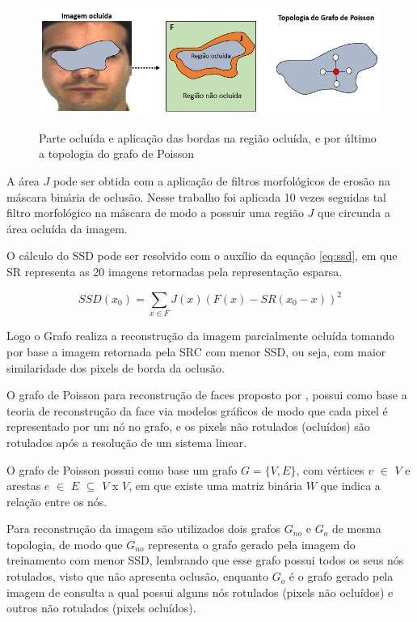 \begin{figure}[H]
\centering
\caption{Parte ocluída e  aplicação das bordas na região ocluída, e por último a topologia do grafo de Poisson}
\includegraphics[scale = 0.8]{imgs/ssd}
\label{fig:ssd}
\end{figure}

A área $J$ pode ser obtida com a aplicação de filtros morfológicos de erosão na máscara binária de oclusão. Nesse trabalho foi aplicada 10 vezes seguidas tal filtro morfológico na máscara de modo a possuir uma região $J$ que circunda a área ocluída da imagem.  
 
O cálculo do SSD pode ser resolvido com o auxílio da equação \ref{eq:ssd}, em que SR representa as 20 imagens retornadas pela representação esparsa. 

\begin{equation}
SSD(x_0) = \sum_{x\in F }J(x)(F(x) - SR(x_0 - x))^2 
\label{eq:ssd}
\end{equation}

Logo o Grafo realiza a reconstrução da imagem parcialmente ocluída tomando por base a imagem retornada pela SRC com menor SSD, ou seja, com maior similaridade dos pixels de borda da oclusão.

O grafo de Poisson para reconstrução de faces proposto por ,  possui como base a teoria de reconstrução da face via modelos gráficos de modo que cada pixel é representado por um nó no grafo, e os pixels não rotulados (ocluídos) são rotulados após a resolução de um sistema linear.

O grafo de Poisson possui como base um grafo $G = \{V,E\}$, com vértices $v$ $\in$ $ V$ e arestas $e$ $\in$ $E$ $\subseteq$ $V$ x $V$, em que existe uma matriz binária $W$ que indica a relação entre os nós.

Para reconstrução da imagem são utilizados dois grafos  $G_{no}$ e $G_o$   de mesma topologia, de modo que $G_{no}$ representa o grafo gerado pela imagem do treinamento com menor SSD, lembrando que esse grafo possui todos os seus nós rotulados, visto que não apresenta oclusão, enquanto $G_o$ é o grafo gerado pela imagem de consulta a qual possui alguns nós rotulados (pixels não ocluídos) e outros não rotulados (pixels ocluídos).


